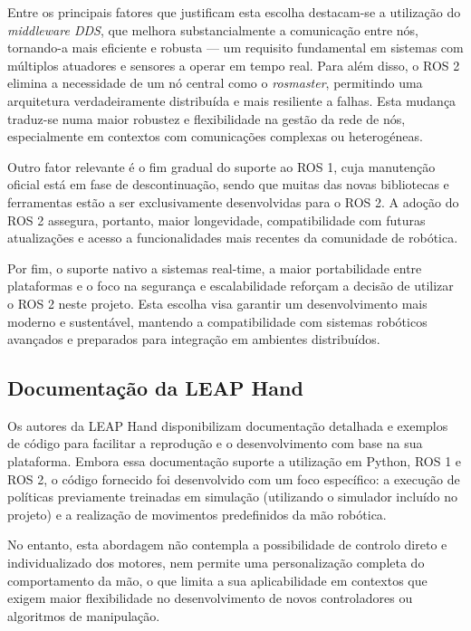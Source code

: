 Entre os principais fatores que justificam esta escolha destacam-se a utilização do \textit{middleware \ac{DDS}}, que melhora substancialmente a comunicação entre nós, tornando-a mais eficiente e robusta — um requisito fundamental em sistemas com múltiplos atuadores e sensores a operar em tempo real. Para além disso, o ROS 2 elimina a necessidade de um nó central como o \textit{rosmaster}, permitindo uma arquitetura verdadeiramente distribuída e mais resiliente a falhas. Esta mudança traduz-se numa maior robustez e flexibilidade na gestão da rede de nós, especialmente em contextos com comunicações complexas ou heterogéneas.

Outro fator relevante é o fim gradual do suporte ao ROS 1, cuja manutenção oficial está em fase de descontinuação, sendo que muitas das novas bibliotecas e ferramentas estão a ser exclusivamente desenvolvidas para o ROS 2. A adoção do ROS 2 assegura, portanto, maior longevidade, compatibilidade com futuras atualizações e acesso a funcionalidades mais recentes da comunidade de robótica.

Por fim, o suporte nativo a sistemas real-time, a maior portabilidade entre plataformas e o foco na segurança e escalabilidade reforçam a decisão de utilizar o ROS 2 neste projeto. Esta escolha visa garantir um desenvolvimento mais moderno e sustentável, mantendo a compatibilidade com sistemas robóticos avançados e preparados para integração em ambientes distribuídos.

\subsection{Documentação da LEAP Hand}

Os autores da LEAP Hand \cite{shaw2023leaphand} disponibilizam documentação detalhada e exemplos de código para facilitar a reprodução e o desenvolvimento com base na sua plataforma. Embora essa documentação suporte a utilização em Python, ROS 1 e ROS 2, o código fornecido foi desenvolvido com um foco específico: a execução de políticas previamente treinadas em simulação (utilizando o simulador incluído no projeto) e a realização de movimentos predefinidos da mão robótica.

No entanto, esta abordagem não contempla a possibilidade de controlo direto e individualizado dos motores, nem permite uma personalização completa do comportamento da mão, o que limita a sua aplicabilidade em contextos que exigem maior flexibilidade no desenvolvimento de novos controladores ou algoritmos de manipulação.


